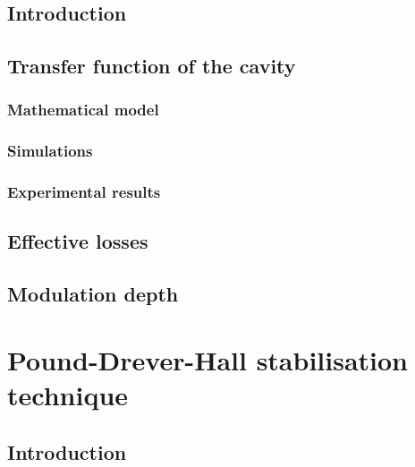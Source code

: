 
\subsection{Introduction}


\subsection{Transfer function of the cavity}


\subsubsection{Mathematical model}


\subsubsection{Simulations}


\subsubsection{Experimental results}


\subsection{Effective losses}


\subsection{Modulation depth}


\section{Pound-Drever-Hall stabilisation technique}


\subsection{Introduction}

